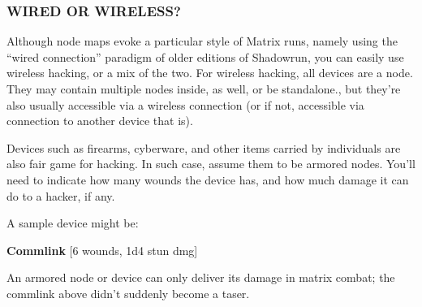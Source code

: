 \documentclass[oneside,10pt]{article}
\begin{document}
\begin{multicols}{2}
\subsubsection{WIRED OR WIRELESS?}
Although node maps evoke a particular style of Matrix
runs, namely using the “wired connection” paradigm of
older editions of Shadowrun, you can easily use wireless
hacking, or a mix of the two. For wireless hacking, all
devices are a node. They may contain multiple nodes
inside, as well, or be standalone., but they’re also usually
accessible via a wireless connection (or if not, accessible
via connection to another device that is).

Devices such as firearms, cyberware, and other items carried by individuals are also fair game for hacking. In such
case, assume them to be armored nodes. You’ll need
to indicate how many wounds the device has, and how
much damage it can do to a hacker, if any.

A sample device might be:
\begin{adjustwidth*}{.5cm}{.5cm}
\textbf{Commlink} [6 wounds, 1d4 stun dmg]
\end{adjustwidth*}
An armored node or device can only deliver its damage
in matrix combat; the commlink above didn’t suddenly
 become a taser.

\end{multicols}


\end{document}
